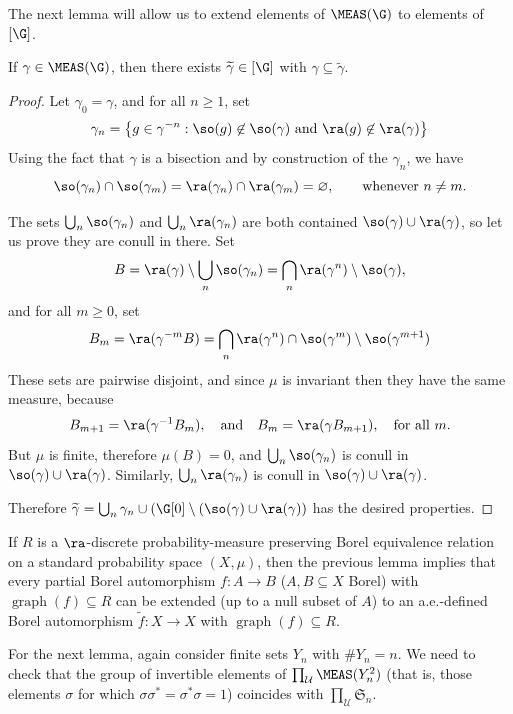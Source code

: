 The next lemma will allow us to extend elements of $\MEAS(\G)$ to elements of $[\G]$.

\begin{lemma}\label{lemmaextensionfullsemigrouptofullgroup}
If $\gamma\in\MEAS(\G)$, then there exists $\widetilde{\gamma}\in[\G]$ with $\gamma\subseteq\widetilde{\gamma}$.
\end{lemma}
\begin{proof}
Let $\gamma_0=\gamma$, and for all $n\geq 1$, set
\[\gamma_n=\left\{g\in \gamma^{-n}:\so(g)\not\in \so(\gamma)\text{ and }\ra(g)\not\in \ra(\gamma)\right\}\]
Using the fact that $\gamma$ is a bisection and by construction of the $\gamma_n$, we have
\[\so(\gamma_n)\cap\so(\gamma_m)=\ra(\gamma_n)\cap\ra(\gamma_m)=\varnothing,\qquad\text{whenever }n\neq m.\]

The sets $\bigcup_n\so(\gamma_n)$ and $\bigcup_n\ra(\gamma_n)$ are both contained $\so(\gamma)\cup\ra(\gamma)$, so let us prove they are conull in there. Set
\[B=\ra(\gamma)\setminus \bigcup_n\so(\gamma_n)=\bigcap_n\ra(\gamma^n)\setminus\so(\gamma),\]
and for all $m\geq 0$, set
\[B_m=\ra(\gamma^{-m}B)=\bigcap_n\ra(\gamma^n)\cap\so(\gamma^m)\setminus\so(\gamma^{m+1})\]
These sets are pairwise disjoint, and since $\mu$ is invariant then they have the same measure, because
\[B_{m+1}=\ra(\gamma^{-1}B_m),\quad\text{and}\quad B_m=\ra(\gamma B_{m+1}),\quad\text{for all }m.\]
But $\mu$ is finite, therefore $\mu(B)=0$, and $\bigcup_n\so(\gamma_n)$ is conull in $\so(\gamma)\cup\ra(\gamma)$. Similarly, $\bigcup_n\ra(\gamma_n)$ is conull in $\so(\gamma)\cup\ra(\gamma)$. 

Therefore $\widetilde{\gamma}=\bigcup_n\gamma_n\cup(\G[0]\setminus(\so(\gamma)\cup\ra(\gamma))$ has the desired properties.\qedhere
\end{proof}

\begin{example}
If $R$ is a $\ra$-discrete probability-measure preserving Borel equivalence relation on a standard probability space $(X,\mu)$, then the previous lemma implies that every partial Borel automorphism $f:A\to B$ ($A,B\subseteq X$ Borel) with $\operatorname{graph}(f)\subseteq R$ can be extended (up to a null subset of $A$) to an a.e.-defined Borel automorphism $\widetilde{f}:X\to X$ with $\operatorname{graph}(f)\subseteq R$.
\end{example}

For the next lemma, again consider finite sets $Y_n$ with $\#Y_n=n$. We need to check that the group of invertible elements of $\prod_\mathcal{U}\MEAS(Y_n^2)$ (that is, those elements $\sigma$ for which $\sigma\sigma^*=\sigma^*\sigma=1$) coincides with $\prod_\mathcal{U}\mathfrak{S}_n$.

